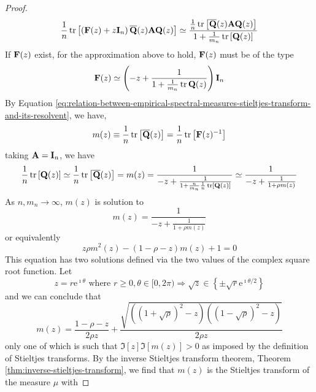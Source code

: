 \begin{proof}
	\begin{equation*}
		\frac{1}{n}\operatorname{tr}\left[\left({\bf F}(z)+z\mathbf{I}_{n}\right)\overline{{\bf Q}}(z){\bf A}{\bf Q}(z)\right]\simeq\frac{\frac{1}{n}\operatorname{tr}\left[\overline{{\bf Q}}(z){\bf A}{\bf Q}(z)\right]}{1+\frac{1}{m_{n}}\operatorname{tr}\left[{\bf Q}(z)\right]}
	\end{equation*}
	If ${\bf F}(z)$ exist, for the approximation above to hold, ${\bf F}(z)$ must be of the type
	\begin{equation*}
		{\bf F}(z)\simeq\left(-z+\frac{1}{1+\frac{1}{m_{n}}\operatorname{tr}{\bf Q}(z)}\right)\mathbf{I}_{n}
	\end{equation*}
	By Equation \ref{eq:relation-between-empirical-spectral-measures-stieltjes-transform-and-its-resolvent}, we have,
	\begin{equation*}
		m(z)\equiv\frac{1}{n}\operatorname{tr}\left[\overline{{\bf Q}}(z)\right]=\frac{1}{n}\operatorname{tr}\left[{\bf F}(z)^{-1}\right]
	\end{equation*}
	taking ${\bf A}=\mathbf{I}_{n}$, we have
	\begin{equation*}
		\frac{1}{n}\operatorname{tr}\left[{\bf Q}(z)\right]\simeq\frac{1}{n}\operatorname{tr}\left[\overline{{\bf Q}}(z)\right]=m(z)=\frac{1}{-z+\frac{1}{1+\frac{n}{m_{n}}\frac{1}{n}\operatorname{tr}\left[{\bf Q}(z)\right]}}\simeq\frac{1}{-z+\frac{1}{1+\rho m(z)}}
	\end{equation*}
	As $n,m_{n}\rightarrow\infty$, $m(z)$ is solution to
	\begin{equation*}
		m(z)=\frac{1}{-z+\frac{1}{1+\rho m(z)}}
	\end{equation*}
	or equivalently
	\begin{equation*}
		z\rho m^{2}(z)-(1-\rho-z)m(z)+1=0
	\end{equation*}
	This equation has two solutions defined via the two values of the complex square root function. Let
	\begin{equation*}
		z=r\mathrm{e}^{\imath\theta}\text{ where }r\geq 0,\theta\in[0,2\pi)\Rightarrow\sqrt{z}\in\left\{\pm\sqrt{r}\mathrm{e}^{\imath\theta/2}\right\}
	\end{equation*}
	and we can conclude that
	\begin{equation*}
		m(z)=\frac{1-\rho-z}{2\rho z}+\frac{\sqrt{\left((1+\sqrt{\rho})^{2}-z\right)\left((1-\sqrt{\rho})^{2}-z\right)}}{2\rho z}
	\end{equation*}
	only one of which is such that $\Im[z]\Im[m(z)]>0$ as imposed by the definition of Stieltjes transforms. By the inverse Stieltjes transform theorem, Theorem \ref{thm:inverse-stieltjes-transform}, we find that $m(z)$ is the Stieltjes transform of the measure $\mu$ with

\end{proof}
